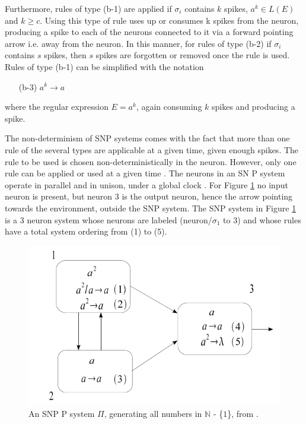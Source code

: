 \documentclass{acm_proc_article-sp}
\begin{document}
Furthermore, rules of type (b-1) are applied if $\sigma_i$ contains $k$
spikes, $a^k \in L(E)$ and $k \geq c$. Using this type of rule uses up
or consumes k spikes from the neuron, producing a spike to
each of the neurons connected to it via a forward pointing arrow i.e. away from the neuron. In this manner, for rules of type (b-2)
if $\sigma_i$ contains $s$ spikes, then $s$ spikes are forgotten or
removed once the rule is used. Rules of type (b-1) can be
simplified with the notation

\begin{definition}
\begin{enumerate}
\begin{enumerate}
\item[(b-3)]$a^k \rightarrow a$
\end{enumerate}
\end{enumerate}
\end{definition}

where the regular expression $E = a^k$, again consuming $k$ spikes and producing a spike.

The non-determinism of SNP systems comes with the fact
that more than one rule of the several types are applicable at
a given time, given enough spikes. The rule to be used is
chosen non-deterministically in the neuron. However, only
one rule can be applied or used at a given time \cite{snp}\cite{snpbrain}\cite{snpmat}. The
neurons in an SN P system operate in parallel and in unison,
under a global clock \cite{snp}. For Figure \ref{snp_ex} no input neuron is present,
but neuron 3 is the output neuron, hence the arrow pointing
towards the environment, outside the SNP system. The SNP system in Figure \ref{snp_ex} is a 3 neuron system whose neurons are labeled (neuron/$\sigma_1$ to 3) and whose rules have a total system ordering from (1) to (5).


	\begin{figure}
		\centering
		\includegraphics[scale=.35]{snp-img.png} 
		\caption{An SNP P system $\Pi$, generating all numbers in $\mathbb N$ - \{$1$\}, from \cite{snpmat}.}
		\label{snp_ex}
	\end{figure}
\end{document}
